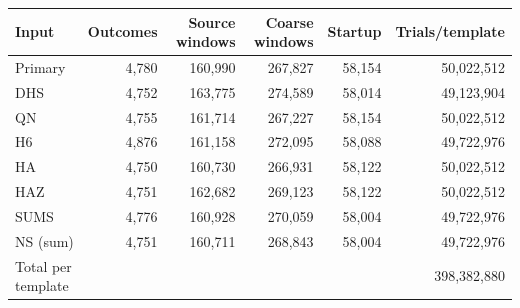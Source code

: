 \begin{center}\small
\begin{tabular}{lrrrrr}
\toprule Input & Outcomes & Source windows & Coarse windows & Startup & Trials/template\\\midrule
Primary & 4,780 & 160,990 & 267,827 & 58,154 & 50,022,512\\
DHS & 4,752 & 163,775 & 274,589 & 58,014 & 49,123,904\\
QN & 4,755 & 161,714 & 267,227 & 58,154 & 50,022,512\\
H6 & 4,876 & 161,158 & 272,095 & 58,088 & 49,722,976\\
HA & 4,750 & 160,730 & 266,931 & 58,122 & 50,022,512\\
HAZ & 4,751 & 162,682 & 269,123 & 58,122 & 50,022,512\\
SUMS & 4,776 & 160,928 & 270,059 & 58,004 & 49,722,976\\
NS (sum) & 4,751 & 160,711 & 268,843 & 58,004 & 49,722,976\\
\midrule Total per template &&&&&398,382,880\\
\bottomrule\end{tabular}\end{center}
